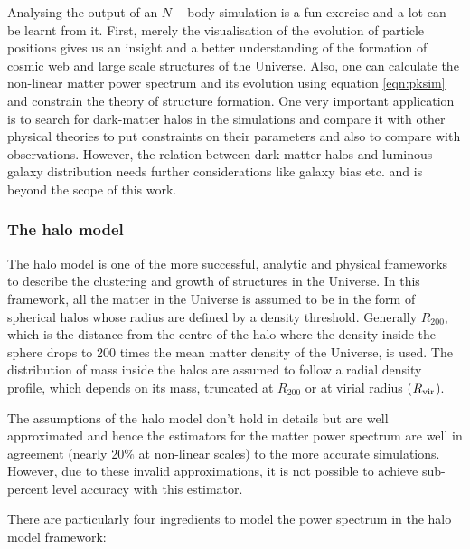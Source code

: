 \documentclass[
  11pt,
  twoside,
  openright,
  titlepage,
  headings=optiontoheadandtoc
]{scrbook}
\begin{document}
Analysing the output of an $N-$body simulation is a fun exercise and a lot can be learnt
from it. First, merely the visualisation of the evolution of particle positions gives
us an insight and a better understanding of the formation of cosmic web and large
scale structures of the Universe. 
Also, one can calculate the non-linear matter power spectrum and its evolution 
using equation \ref{eqn:pksim} and constrain the theory of structure formation. One very important
application is to search for dark-matter halos in the simulations and compare
it with other physical theories to put constraints on their parameters and also
to compare with observations. However, the relation between dark-matter halos
and luminous galaxy distribution needs further considerations like galaxy 
bias etc. and is beyond the scope of this work. 




\subsubsection{The halo model}

The halo model \cite{1977ApJ...217..331M,2000ApJ...543..503M,2000MNRAS.318.1144P,2000MNRAS.318..203S} 
is one of the more successful, analytic and physical frameworks to describe
the clustering and growth of structures in the Universe. In this framework, all the matter
in the Universe is assumed to be in the form of spherical halos whose radius are defined by a 
density threshold. Generally $R_{200}$, which is the distance from the centre of the halo where
the density inside the sphere drops to 200 times the mean matter density of the Universe, is used. 
The  distribution of mass inside the halos are assumed to follow a radial density 
profile, which depends on its mass, truncated at $R_{200}$ or at virial 
radius ($R_{\rm vir}$).

The assumptions of the halo model don't hold in details but are well approximated and 
hence the estimators for the matter power spectrum are well in agreement 
(nearly 20$\%$ at non-linear scales)
to the more accurate simulations. However, due to these invalid approximations, it is not
possible to achieve sub-percent level accuracy with this estimator. 

There are particularly four ingredients to model the power spectrum in the halo model framework:
\end{document}
